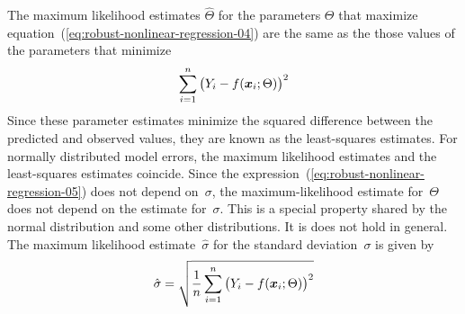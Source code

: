 \documentclass{admbmanual}
\begin{document}
The maximum likelihood estimates
$\widehat\Theta$ for the parameters $\Theta$ that maximize 
equation~(\ref{eq:robust-nonlinear-regression-04}) %
are the same as the those values of the parameters
that minimize
\begin{equation}\label{eq:robust-nonlinear-regression-05} %
  \sum_{i=1}^n\big(Y_i-f({\mbox{\boldmath $x$}}_i;\Theta)\big)^2
\end{equation}
Since these parameter estimates minimize the 
squared difference between the predicted and
observed values, they are known as the least-squares estimates. 
For normally distributed model errors, the maximum likelihood estimates
and the least-squares estimates coincide. Since the expression~(\ref{eq:robust-nonlinear-regression-05}) %
does not depend on~$\sigma$, the maximum-likelihood
estimate for~$\Theta$ does not depend on the estimate for~$\sigma$.
This is a special property shared by the normal distribution and
some other distributions. It is does not hold in general.
The maximum likelihood 
estimate~$\hat\sigma$ for the standard deviation~$\sigma$ is given by
\begin{equation}\label{eq:robust-nonlinear-regression-06} %
  \hat\sigma=\sqrt{\frac{1}{n}\sum_{i=1}^n\big(Y_i-f({\mbox{\boldmath $x$}}_i;\Theta)\big)^2}
\end{equation}
\end{document}
